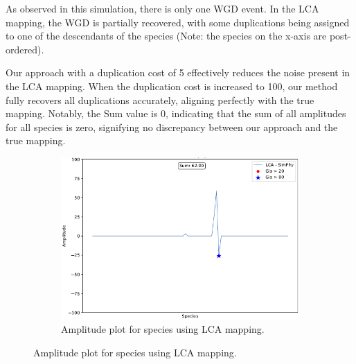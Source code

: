 \documentclass[10pt]{article}
\begin{document}
As observed in this simulation, there is only one WGD event. In the LCA mapping, the WGD is partially recovered, with some duplications being assigned to one of the descendants of the species (Note: the species on the x-axis are post-ordered).

Our approach with a duplication cost of 5 effectively reduces the noise present in the LCA mapping. When the duplication cost is increased to 100, our method fully recovers all duplications accurately, aligning perfectly with the true mapping. Notably, the Sum value is 0, indicating that the sum of all amplitudes for all species is zero, signifying no discrepancy between our approach and the true mapping.
 
\begin{figure}[h!]
    \centering
    \begin{subfigure}[b]{0.5\textwidth}
        \centering
        \includegraphics[width=\textwidth]{figs/LCA-amp.PNG}
        \caption{Amplitude plot for species using LCA mapping.}
        \label{fig:amp-a}
    \end{subfigure}
    

\end{figure}
\end{document}
